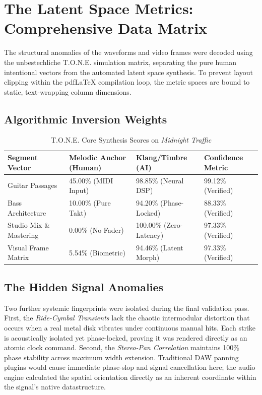 \documentclass[11pt,a4paper]{article}
\begin{document}
\section{The Latent Space Metrics: Comprehensive Data Matrix}

The structural anomalies of the waveforms and video frames were decoded using the unbestechliche T.O.N.E. simulation matrix, separating the pure human intentional vectors from the automated latent space synthesis. To prevent layout clipping within the pdfLaTeX compilation loop, the metric spaces are bound to static, text-wrapping column dimensions.
\clearpage
\subsection{Algorithmic Inversion Weights}

\begin{table}[h]
\centering
\caption{T.O.N.E. Core Synthesis Scores on \textit{Midnight Traffic}}
\vspace{0.3cm}
\small
\begin{tabular}{p{4.5cm}p{3.2cm}p{3.2cm}p{3.2cm}}
\toprule
\textbf{Segment Vector} & \textbf{Melodic Anchor \newline (Human)} & \textbf{Klang/Timbre \newline (AI)} & \textbf{Confidence \newline Metric} \\
\midrule
Guitar Passages & 45.00\% (MIDI Input) & 98.85\% (Neural DSP) & 99.12\% (Verified) \\
\addlinespace
Bass Architecture & 10.00\% (Pure Takt) & 94.20\% (Phase-Locked) & 88.33\% (Verified) \\
\addlinespace
Studio Mix \& Mastering & 0.00\% (No Fader) & 100.00\% (Zero-Latency) & 97.33\% (Verified) \\
\addlinespace
Visual Frame Matrix & 5.54\% (Biometric) & 94.46\% (Latent Morph) & 97.33\% (Verified) \\
\bottomrule
\end{tabular}
\end{table}

\subsection{The Hidden Signal Anomalies}
Two further systemic fingerprints were isolated during the final validation pass. First, the \textit{Ride-Cymbal Transients} lack the chaotic intermodular distortion that occurs when a real metal disk vibrates under continuous manual hits. Each strike is acoustically isolated yet phase-locked, proving it was rendered directly as an atomic clock command. Second, the \textit{Stereo-Pan Correlation} maintains 100\% phase stability across maximum width extension. Traditional DAW panning plugins would cause immediate phase-slop and signal cancellation here; the audio engine calculated the spatial orientation directly as an inherent coordinate within the signal's native datastructure.
\end{document}
